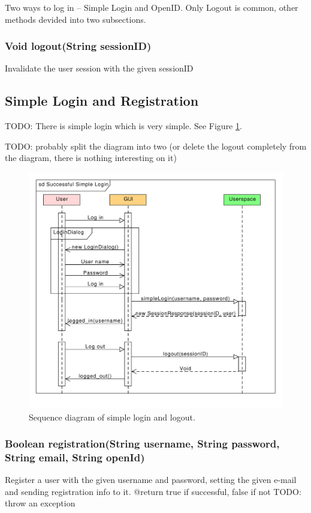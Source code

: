 Two ways to log in -- Simple Login and OpenID. Only Logout is common, other methods devided into two subsections.


\subsubsection{Void logout(String sessionID)}
Invalidate the user session with the given sessionID


\subsection{Simple Login and Registration}
\label{subsec:simple_login}

TODO: There is simple login which is very simple. See Figure \ref{gui:sd:simple_login}.

TODO: probably split the diagram into two (or delete the logout completely from the diagram, there is nothing interesting on it)

\begin{figure}[h]
\begin{center}
\includegraphics[scale=0.65]{figures/simple_login_sequence.pdf}
\end{center}
\caption{Sequence diagram of simple login and logout.}\label{gui:sd:simple_login}
\end{figure}

\subsubsection{Boolean registration(String username, String password, String email, String openId)}
Register a user with the given username and password, setting the given e-mail and sending registration info to it.
@return true if successful, false if not
TODO: throw an exception


